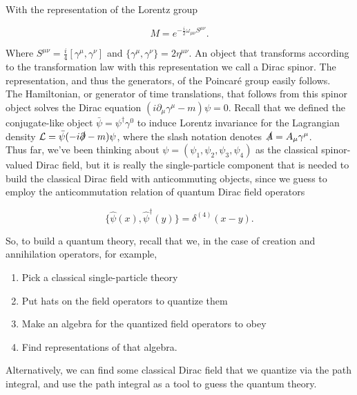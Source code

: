 \noindent With the representation of the Lorentz group

\begin{equation}
M = e^{-\frac{i}{2} \omega_{\mu\nu} S^{\mu \nu}}.
\end{equation}

\noindent Where $S^{\mu\nu} = \frac{i}{4} [\gamma^\mu, \gamma^\nu]$ and $\{ \gamma^\mu, \gamma^\nu \} = 2 \eta^{\mu\nu}$. An object that transforms according to the transformation law with this representation we call a Dirac spinor. The representation, and thus the generators, of the Poincar\'e group easily follows. \\

\noindent The Hamiltonian, or generator of time translations, that follows from this spinor object solves the Dirac equation $(i\partial_\mu \gamma^\mu - m) \psi = 0$. Recall that we defined the conjugate-like object $\bar{\psi} = \psi^\dagger \gamma^0$ to induce Lorentz invariance for the Lagrangian density $\mathcal{L} = \bar{\psi} (-i\slashed{\partial} - m) \psi$, where the slash notation denotes $\slashed{A} = A_\mu \gamma^\mu$. \\

\noindent Thus far, we've been thinking about $\psi = (\psi_1, \psi_2, \psi_3, \psi_4)$ as the classical spinor-valued Dirac field, but it is really the single-particle component that is needed to build the classical Dirac field with anticommuting objects, since we guess to employ the anticommutation relation of quantum Dirac field operators 

\begin{equation}
\{ \hat{\psi} (x), \hat{\psi}^\dagger (y) \} = \delta^{(4)} (x-y).
\end{equation}

\noindent So, to build a quantum theory, recall that we, in the case of creation and annihilation operators, for example,

\begin{enumerate}
\item Pick a classical single-particle theory
\item Put hats on the field operators to quantize them
\item Make an algebra for the quantized field operators to obey
\item Find representations of that algebra.
\end{enumerate}

\noindent Alternatively, we can find some classical Dirac field that we quantize via the path integral, and use the path integral as a tool to guess the quantum theory. \\

